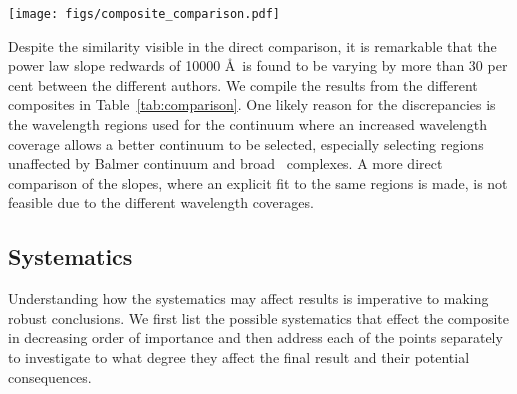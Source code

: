 \documentclass{aa}    %
\newcommand{\figlabel}[1]{\label{fig:#1}}
\newcommand{\Tab}[1]{Table~\ref{tab:#1}}
\newcommand{\tab}[1]{\Tab{#1}}
\newcommand{\sectlabel}[1]{\label{sect:#1}}
\newcommand{\lya}{Ly$\alpha$}
\newcommand{\feii}{\ion{Fe}{ii}}
\begin{document}
{ %
 \begin{figure*}[t!]
   \centering
   \texttt{[image: figs/composite\_comparison.pdf]}
   \caption[]{Comparison of different composites. The composites by \citet{Lusso2015, VandenBerk2001, Telfer2002, Francis1991} are normalized to the X-shooter composite at $\sim 1450$ \AA~and the composite by \citet{Glikman2006} is normalized to ours at $\sim 3850$ \AA. Significant differences is visible blueward of \lya~due to differing IGM correction methods. Above 5000 \AA~ significant host galaxy contamination is visible in the composite by \citet{VandenBerk2001}. Overplot in blue is a pure power law with slope $\alpha = -1.7$ and normalized at $\sim 1450$ \AA.}
  \figlabel{composite_comparison}
 \end{figure*}
  
 
Despite the similarity visible in the direct comparison, it is remarkable that the power law slope redwards of 10000 \AA~is found to be varying by more than 30 per cent between the different authors. We compile the results from the different composites in \tab{comparison}. One likely reason for the discrepancies is the wavelength regions used for the continuum where an increased wavelength coverage allows a better continuum to be selected, especially selecting regions unaffected by Balmer continuum and broad \feii~complexes. A more direct comparison of the slopes, where an explicit fit to the same regions is made, is not feasible due to the different wavelength coverages. 





\subsection{Systematics}  \sectlabel{systematics}

Understanding how the systematics may affect results is imperative to making robust conclusions. We first list the possible systematics that effect the composite in decreasing order of importance and then address each of the points separately to investigate to what degree they affect the final result and their potential consequences.


}
\end{document}

